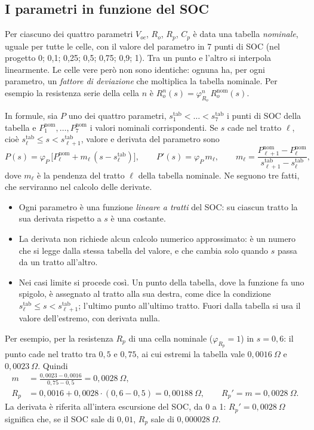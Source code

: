 \documentclass[11pt,a4paper]{article}
\newcommand{\nom}{\mathrm{nom}}
\newcommand{\stab}{s^{\mathrm{tab}}}        %
\begin{document}
\subsection{I parametri in funzione del SOC}\label{sec:tabelle}

Per ciascuno dei quattro parametri $V_{oc}$, $R_o$, $R_p$, $C_p$ è data una
tabella \emph{nominale}, uguale per tutte le celle, con il valore del
parametro in 7 punti di SOC (nel progetto 0; 0,1; 0,25; 0,5; 0,75; 0,9; 1).
Tra un punto e l'altro si interpola linearmente. Le celle vere però non sono
identiche: ognuna ha, per ogni parametro, un \emph{fattore di deviazione} che
moltiplica la tabella nominale. Per esempio la resistenza serie della cella
$n$ è $R_o^n(s) = \varphi^n_{R_o}\,R_o^{\nom}(s)$.

In formule, sia $P$ uno dei quattro parametri, $\stab_1 < \dots < \stab_7$ i
punti di SOC della tabella e $P^{\nom}_1, \dots, P^{\nom}_7$ i valori nominali
corrispondenti. Se $s$ cade nel tratto $\ell$, cioè
$\stab_\ell \le s < \stab_{\ell+1}$, valore e derivata del parametro sono
\begin{equation}
  P(s) = \varphi_P\,\bigl[P^{\nom}_\ell + m_\ell\,(s - \stab_\ell)\bigr],
  \qquad
  P'(s) = \varphi_P\, m_\ell ,
  \qquad
  m_\ell = \frac{P^{\nom}_{\ell+1} - P^{\nom}_\ell}{\stab_{\ell+1} - \stab_\ell} ,
  \tag{T}\label{eq:tabella}
\end{equation}
dove $m_\ell$ è la pendenza del tratto $\ell$ della tabella nominale. Ne seguono tre
fatti, che serviranno nel calcolo delle derivate.
\begin{itemize}
  \item Ogni parametro è una funzione \emph{lineare a tratti} del SOC: su
        ciascun tratto la sua derivata rispetto a $s$ è una costante.
  \item La derivata non richiede alcun calcolo numerico approssimato: è un
        numero che si legge dalla stessa tabella del valore, e che cambia solo
        quando $s$ passa da un tratto all'altro.
  \item Nei casi limite si procede così. Un punto della tabella, dove la
        funzione fa uno spigolo, è assegnato al tratto alla sua destra, come
        dice la condizione $\stab_\ell \le s < \stab_{\ell+1}$; l'ultimo punto
        all'ultimo tratto. Fuori dalla tabella si usa il valore dell'estremo,
        con derivata nulla.
\end{itemize}
Per esempio, per la resistenza $R_p$ di una cella nominale ($\varphi_{R_p} = 1$) in
$s = 0{,}6$: il punto cade nel tratto tra $0{,}5$ e $0{,}75$, ai cui estremi
la tabella vale $0{,}0016~\Omega$ e $0{,}0023~\Omega$. Quindi
\begin{align*}
  m &= \frac{0{,}0023 - 0{,}0016}{0{,}75 - 0{,}5} = 0{,}0028~\Omega , \\[2pt]
  R_p &= 0{,}0016 + 0{,}0028 \cdot (0{,}6 - 0{,}5) = 0{,}00188~\Omega ,
  \qquad
  R_p' = m = 0{,}0028~\Omega .
\end{align*}
La derivata è riferita all'intera escursione del SOC, da 0 a 1:
$R_p' = 0{,}0028~\Omega$ significa che, se il SOC sale di $0{,}01$, $R_p$ sale
di $0{,}000028~\Omega$.
\end{document}
